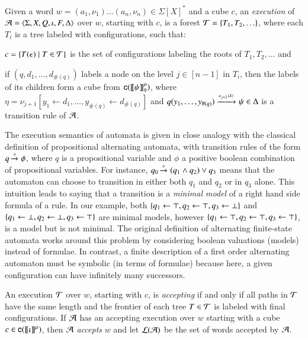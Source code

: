 \begin{definition}\label{def:execution}
Given a word $w=(a_1,\nu_1) \ldots (a_n,\nu_n) \in \Sigma[X]^*$ and a
cube $c$, an \emph{execution} of
$\mathcal{A}=\langle \Sigma,X,Q,\iota,F,\Delta \rangle$ over $w$, starting with $c$, is
a forest $\mathcal{T} = \{ T_1,T_2,\ldots \}$, where each $T_i$ is a tree
labeled with configurations, such that:
\begin{compactenum}
\item\label{it1:execution} $c = \{ T(\epsilon) \mid T \in \mathcal{T} \}$ is the set of
  configurations labeling the roots of $T_1,T_2,\ldots$ and
%
\item\label{it2:execution} if $(q,d_1,\ldots,d_{\#(q)})$ labels a node
  on the level $j \in [n-1]$ in $T_i$, then the labels of its children
  form a cube from $\mathsf{c}({{\bf [\![} \psi {\bf ]\!]}^\mu_{\eta}})$, where $\eta =
  \nu_{j+1}[y_1 \leftarrow d_1,\ldots,y_{\#(q)} \leftarrow d_{\#(q)}]$
  and \(q(y_1,\ldots,y_{\#(q)}) \xrightarrow{{\scriptscriptstyle a_{j+1}(X)}}_{{\scriptstyle }} \psi \in \Delta\)
  is a transition rule of $\mathcal{A}$.
\end{compactenum}
\end{definition}

The execution semantics of automata is given in close analogy with the
classical definition of propositional alternating automata, with
transition rules of the form $q \xrightarrow{{\scriptscriptstyle a}}_{{\scriptstyle }} \phi$, where $q$ is a
propositional variable and $\phi$ a positive boolean combination of
propositional variables. For instance, $q_0 \xrightarrow{{\scriptscriptstyle a}}_{{\scriptstyle }} (q_1 \wedge
q_2) \vee q_3$ means that the automaton can choose to transition in
either both $q_1$ and $q_2$ or in $q_3$ alone. This intuition leads to
saying that a transition is a \emph{minimal model} of a right hand
side formula of a rule. In our example, both $\{ q_1 \leftarrow
  \top, q_2 \leftarrow \top, q_3 \leftarrow \bot \}$ and $\{ q_1
  \leftarrow \bot, q_2 \leftarrow \bot, q_3 \leftarrow \top \}$ are
minimal models, however $\{ q_1 \leftarrow \top, q_2 \leftarrow
  \top, q_3 \leftarrow \top \}$, is a model but is not minimal. The
original definition of alternating finite-state automata
\cite{ChandraKozenStockmeyer81} works around this problem by
considering boolean valuations (models) instead of formulae. In
contrast, a finite description of a first order alternating automaton
must be symbolic (in terms of formulae) because here, a given
configuration can have infinitely many successors.

An execution $\mathcal{T}$ over $w$, starting with $c$, is \emph{accepting} if
and only if all paths in $\mathcal{T}$ have the same length and the frontier of
each tree $T \in \mathcal{T}$ is labeled with final configurations.  If $\mathcal{A}$
has an accepting execution over $w$ starting with a cube $c \in
\mathsf{c}({{\bf [\![} \iota {\bf ]\!]}^\mu})$, then $\mathcal{A}$ \emph{accepts} $w$ and let
${\mathcal L}({\mathcal{A}})$ be the set of words accepted by $\mathcal{A}$.

